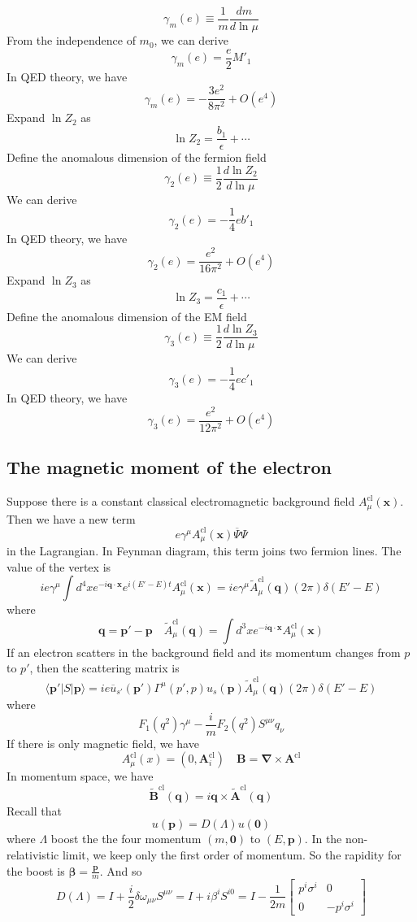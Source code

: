 \[\gamma_m(e) \equiv \frac{1}{m} \frac{dm}{d \ln \mu}\]
From the independence of $m_0$, we can derive
\[\gamma_m(e) = \frac{e}{2} M'_1\]
In QED theory, we have
\[\gamma_m(e) = -\frac{3e^2}{8\pi^2} + O(e^4)\]
Expand $\ln Z_{2}$ as
\[\ln Z_{2} = \frac{b_1}{\epsilon} + \cdots\]
Define the anomalous dimension of the fermion field
\[\gamma_{2}(e) \equiv \frac{1}{2} \frac{d\ln Z_{2}}{d \ln \mu}\]
We can derive
\[\gamma_{2}(e) = -\frac{1}{4}e b'_1\]
In QED theory, we have
\[\gamma_2(e) = \frac{e^2}{16\pi^2} + O(e^4)\]
Expand $\ln Z_{3}$ as
\[\ln Z_{3} = \frac{c_1}{\epsilon} + \cdots\]
Define the anomalous dimension of the EM field
\[\gamma_{3}(e) \equiv \frac{1}{2} \frac{d\ln Z_{3}}{d \ln \mu}\]
We can derive
\[\gamma_{3}(e) = -\frac{1}{4}e c'_1\]
In QED theory, we have
\[\gamma_3(e) = \frac{e^2}{12\pi^2} + O(e^4)\]

\subsection{The magnetic moment of the electron}
Suppose there is a constant classical electromagnetic background field $A_{\mu}^{\mathrm{cl}}(\bm{x})$. Then we have a new term
\[e\gamma^{\mu}A_{\mu}^{\mathrm{cl}}(\bm{x}) \overline{\Psi}\Psi\]
in the Lagrangian. In Feynman diagram, this term joins two fermion lines. The value of the vertex is
\[ie\gamma^{\mu}\int d^4x e^{-i\bm{q}\cdot\bm{x}}e^{i(E'-E)t} A_{\mu}^{\mathrm{cl}}(\bm{x}) = ie\gamma^{\mu}\tilde{A}_{\mu}^{\mathrm{cl}}(\bm{q})(2\pi)\delta(E'-E)\]
where
\[\bm{q} = \bm{p}' - \bm{p} \quad \tilde{A}_{\mu}^{\mathrm{cl}}(\bm{q}) = \int d^3x e^{-i\bm{q}\cdot\bm{x}} A_{\mu}^{\mathrm{cl}}(\bm{x})\]
If an electron scatters in the background field and its momentum changes from $p$ to $p'$, then the scattering matrix is
\[\langle \bm{p}' | S | \bm{p} \rangle = ie\overline{u}_{s'}(\bm{p}')\Gamma^{\mu}(p',p)u_s(\bm{p})\tilde{A}_{\mu}^{\mathrm{cl}}(\bm{q})(2\pi)\delta(E'-E)\]
where
\[F_1(q^2)\gamma^{\mu} - \frac{i}{m}F_2(q^2)S^{\mu\nu}q_{\nu}\]
If there is only magnetic field, we have
\[A_{\mu}^{\mathrm{cl}}(x) = (0,\bm{A}_{i}^{\mathrm{cl}}) \quad \bm{B} = \bm{\nabla} \times \bm{A}^{\mathrm{cl}}\]
In momentum space, we have
\[\tilde{\bm{B}}^{\mathrm{cl}}(\bm{q}) = i\bm{q}\times\tilde{\bm{A}}^{\mathrm{cl}}(\bm{q})\]
Recall that
\[u(\bm{p}) = D(\Lambda)u(\bm{0})\]
where $\Lambda$ boost the the four momentum $(m,\bm{0})$ to $(E,\bm{p})$.
In the non-relativistic limit, we keep only the first order of momentum. So the rapidity for the boost is $\bm{\beta} = \frac{\bm{p}}{m}$. And so
\[D(\Lambda) = I + \frac{i}{2}\delta\omega_{\mu\nu}S^{\mu\nu} = I + i \beta^i S^{i0} = I - \frac{1}{2m} \begin{bmatrix} p^i \sigma^i  &0\\0& -p^i \sigma^i \end{bmatrix} \]
